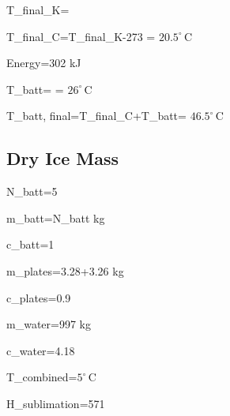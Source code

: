 \documentclass[11pt]{article}
\numberwithin{equation}{subsection} %
\newcommand{\unit}[1]{\ensuremath{\, \mathrm{#1}}}             %
\newcommand{\degree}{^\circ}                                   %
\begin{document}
T_{final_K}=

T_{final_C}=T_{final_K}-273 = $20.5\degree\unit{C}$%


Energy=302 kJ %

\Delta T_{batt}= = $26\degree\unit{C}$%

T_{batt, final}=T_{final_C}+\Delta T_{batt}= $46.5\degree\unit{C}$

\subsection{Dry Ice Mass}\label{ice-mass}

N_{batt}=5 %

m_{batt}=N_{batt} kg  %

c_{batt}=1 

m_{plates}=3.28+3.26 kg

c_{plates}=0.9 

m_{water}=997 kg

c_{water}=4.18 

\Delta T_{combined}=$5\degree\unit{C}$

\Delta H_{sublimation}=571 
\end{document}
